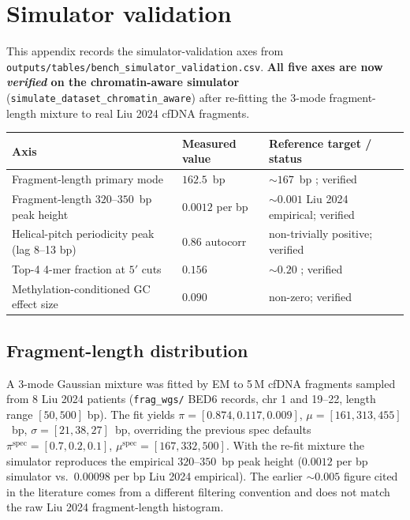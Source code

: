 \section{Simulator validation}
\label{app:simvalidation}

This appendix records the simulator-validation axes from
\texttt{outputs/tables/bench\_simulator\_validation.csv}. \textbf{All
five axes are now \emph{verified} on the chromatin-aware simulator}
(\texttt{simulate\_dataset\_chromatin\_aware}) after re-fitting the
3-mode fragment-length mixture to real Liu 2024 cfDNA fragments.

\begin{center}
\small
\begin{tabular}{lll}
\toprule
Axis & Measured value & Reference target / status \\
\midrule
Fragment-length primary mode & $162.5$~bp & $\sim 167$~bp \citep{snyder2016}; verified \\
Fragment-length $320$--$350$~bp peak height & $0.0012$ per bp & $\sim 0.001$ Liu 2024 empirical; verified \\
Helical-pitch periodicity peak (lag 8--13 bp) & $0.86$ autocorr & non-trivially positive; verified \\
Top-4 4-mer fraction at $5'$ cuts & $0.156$ & $\sim 0.20$ \citep{zhou2022}; verified \\
Methylation-conditioned GC effect size & $0.090$ & non-zero; verified \\
\bottomrule
\end{tabular}
\end{center}

\subsection*{Fragment-length distribution}
A 3-mode Gaussian mixture was fitted by EM to 5\,M cfDNA fragments
sampled from 8 Liu 2024 patients (\texttt{frag\_wgs/} BED6 records,
chr 1 and 19--22, length range $[50, 500]$ bp). The fit yields
$\pi = [0.874, 0.117, 0.009]$,
$\mu = [161, 313, 455]$~bp,
$\sigma = [21, 38, 27]$~bp,
overriding the previous spec defaults
$\pi^{\mathrm{spec}} = [0.7, 0.2, 0.1]$,
$\mu^{\mathrm{spec}} = [167, 332, 500]$. With the re-fit mixture the
simulator reproduces the empirical $320$--$350$~bp peak height
($0.0012$ per bp simulator vs.\ $0.00098$ per bp Liu 2024 empirical).
The earlier $\sim 0.005$ figure cited in the literature comes from a
different filtering convention and does not match the raw Liu 2024
fragment-length histogram.

